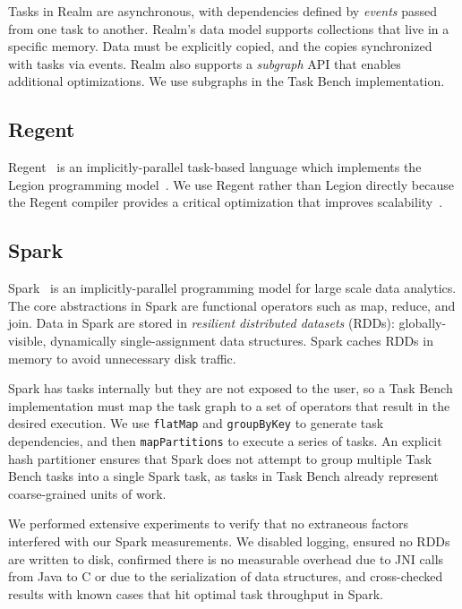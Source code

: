 Tasks in Realm are asynchronous, with dependencies
defined by \emph{events} passed from one task
to another. Realm's data model supports collections that live in a
specific memory. Data must be explicitly copied, and the copies
synchronized with tasks via events.
Realm also supports a \emph{subgraph} API that enables additional
optimizations. We use subgraphs in the Task
Bench implementation.

\subsection{Regent}

Regent~\cite{Regent15} is an implicitly-parallel task-based language
which implements the Legion programming model~\cite{Legion12}. We use
Regent rather than Legion directly because the Regent compiler
provides a critical optimization that
improves scalability~\cite{ControlReplication17}.

\subsection{Spark}

Spark~\cite{Spark10} is an implicitly-parallel programming model for
large scale data analytics.
The core abstractions in Spark are functional operators such as map,
reduce, and join. Data in Spark are stored in
\emph{resilient
  distributed datasets} (RDDs): globally-visible,
dynamically single-assignment data structures. Spark caches RDDs in memory to avoid unnecessary
disk traffic.

Spark has tasks internally but they are not exposed to the user,
so a Task Bench implementation must map the task graph to a set of operators that result in the
desired execution. We use
\lstinline[language=Scala]{flatMap} and
\lstinline[language=Scala]{groupByKey} to generate task
dependencies, and then \lstinline[language=Scala]{mapPartitions} to execute a
series of tasks. An explicit hash partitioner ensures that
Spark does not attempt to group multiple Task Bench tasks into a
single Spark task, as tasks in Task Bench already represent coarse-grained units of work.

We performed extensive experiments to verify that no
extraneous factors interfered with our Spark measurements. We
disabled logging, ensured no RDDs are written
to disk, confirmed there is no measurable overhead due to JNI
calls from Java to C or due to the serialization of data structures, and cross-checked results with known cases
that hit optimal task throughput in Spark.

